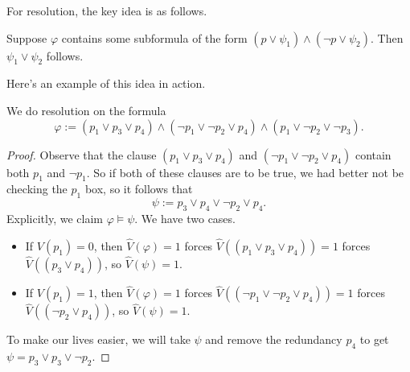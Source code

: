 For resolution, the key idea is as follows.
\begin{idea}
	Suppose $\varphi$ contains some subformula of the form $(p\lor\psi_1)\land(\lnot p\lor\psi_2)$. Then $\psi_1\lor\psi_2$ follows.
\end{idea}
Here's an example of this idea in action.
\begin{exe} \label{exe:resolutionex}
	We do resolution on the formula
	\[\varphi:=(p_1\lor p_3\lor p_4)\land(\lnot p_1\lor\lnot p_2\lor p_4)\land(p_1\lor\lnot p_2\lor\lnot p_3).\]
\end{exe}
\begin{proof}
	Observe that the clause $(p_1\lor p_3\lor p_4)$ and $(\lnot p_1\lor\lnot p_2\lor p_4)$ contain both $p_1$ and $\lnot p_1$. So if both of these clauses are to be true, we had better not be checking the $p_1$ box, so it follows that
	\[\psi:=p_3\lor p_4\lor\lnot p_2\lor p_4.\]
	Explicitly, we claim $\varphi\models\psi$. We have two cases.
	\begin{itemize}
		\item If $V(p_1)=0$, then $\hat V(\varphi)=1$ forces $\hat V((p_1\lor p_3\lor p_4))=1$ forces $\hat V((p_3\lor p_4))$, so $\hat V(\psi)=1$.
		\item If $V(p_1)=1$, then $\hat V(\varphi)=1$ forces $\hat V((\lnot p_1\lor\lnot p_2\lor p_4))=1$ forces $\hat V((\lnot p_2\lor p_4))$, so $\hat V(\psi)=1$.
	\end{itemize}
	To make our lives easier, we will take $\psi$ and remove the redundancy $p_4$ to get $\psi=p_3\lor p_3\lor\lnot p_2$.


\end{proof}
